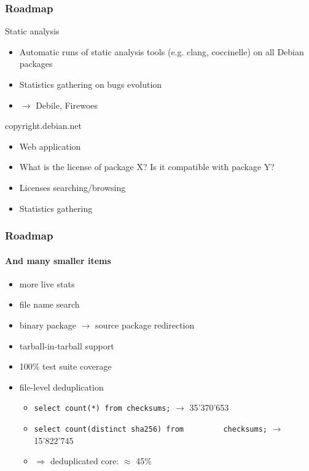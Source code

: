 \documentclass{beamer}
\begin{document}
\begin{frame}
  \frametitle{Roadmap}
  \begin{block}{Static analysis}
    \begin{itemize}
      \item Automatic runs of static analysis tools (e.g. clang,
        coccinelle) on all Debian packages
      \item Statistics gathering on bugs evolution
      \item $\to$ Debile, Firewoes
    \end{itemize}
  \end{block}
  \pause
  \begin{block}{copyright.debian.net}
    \begin{itemize}
    \item Web application
    \item What is the license of package X? Is it compatible with
      package Y?
    \item Licenses searching/browsing
    \item Statistics gathering
    \end{itemize}
  \end{block}
\end{frame}

\begin{frame}
  \frametitle{Roadmap}
  \framesubtitle{And many smaller items}
  \begin{itemize}
  \item more live stats
    \pause
  \item file name search
    \pause
  \item binary package $\to$ source package redirection
    \pause
  \item tarball-in-tarball support
    \pause
  \item 100\% test suite coverage
    \pause
  \item file-level deduplication
    \begin{itemize}
    \item \lstinline[style=sql]{select count(*) from checksums;}
      \hfill $\rightarrow$ 35'370'653
    \item
      \lstinline[style=sql]{select count(distinct sha256) from
        checksums;}
      \hfill $\rightarrow$ 15'822'745
    \item[] \hfill $\Rightarrow$ \alert{deduplicated core:
      $\approx$ 45\%}
    \end{itemize}
  \end{itemize}
\end{frame}
\end{document}
